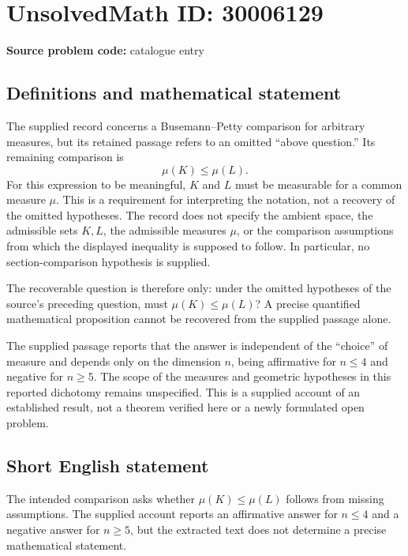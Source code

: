 \documentclass[11pt]{article}
\begin{document}
\section*{UnsolvedMath ID: 30006129}
\textbf{Source problem code:} catalogue entry
\subsection{Definitions and mathematical statement}
The supplied record concerns a Busemann--Petty comparison for arbitrary measures, but its retained passage refers to an omitted ``above question.'' Its remaining comparison is
\[
\mu(K)\leq\mu(L).
\]
For this expression to be meaningful, \(K\) and \(L\) must be measurable for a common measure \(\mu\). This is a requirement for interpreting the notation, not a recovery of the omitted hypotheses. The record does not specify the ambient space, the admissible sets \(K,L\), the admissible measures \(\mu\), or the comparison assumptions from which the displayed inequality is supposed to follow. In particular, no section-comparison hypothesis is supplied.

The recoverable question is therefore only: under the omitted hypotheses of the source's preceding question, must \(\mu(K)\leq\mu(L)\)? A precise quantified mathematical proposition cannot be recovered from the supplied passage alone.

The supplied passage reports that the answer is independent of the ``choice'' of measure and depends only on the dimension \(n\), being affirmative for \(n\leq4\) and negative for \(n\geq5\). The scope of the measures and geometric hypotheses in this reported dichotomy remains unspecified. This is a supplied account of an established result, not a theorem verified here or a newly formulated open problem.
\subsection{Short English statement}
The intended comparison asks whether \(\mu(K)\leq\mu(L)\) follows from missing assumptions. The supplied account reports an affirmative answer for \(n\leq4\) and a negative answer for \(n\geq5\), but the extracted text does not determine a precise mathematical statement.
\end{document}
